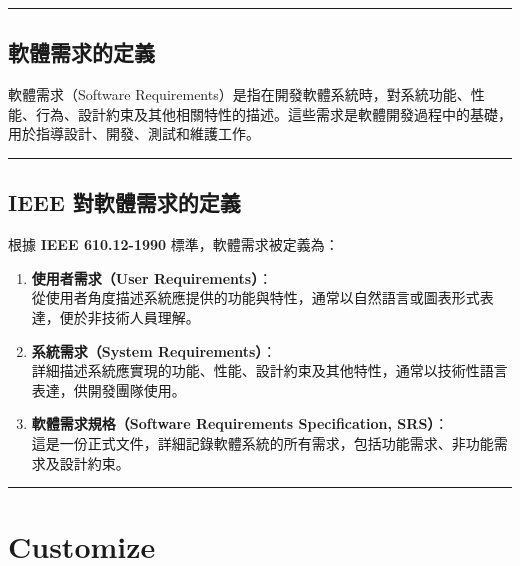 \documentclass[
  letterpaper,
  oneside,
  open=any]{scrbook}
\begin{document}
\begin{center}\rule{0.5\linewidth}{0.5pt}\end{center}

\section{軟體需求的定義}\label{ux8edfux9ad4ux9700ux6c42ux7684ux5b9aux7fa9}

軟體需求（Software
Requirements）是指在開發軟體系統時，對系統功能、性能、行為、設計約束及其他相關特性的描述。這些需求是軟體開發過程中的基礎，用於指導設計、開發、測試和維護工作。

\begin{center}\rule{0.5\linewidth}{0.5pt}\end{center}

\section{IEEE
對軟體需求的定義}\label{ieee-ux5c0dux8edfux9ad4ux9700ux6c42ux7684ux5b9aux7fa9}

根據 \textbf{IEEE 610.12-1990} 標準，軟體需求被定義為：

\begin{enumerate}
\def\labelenumi{\arabic{enumi}.}
\item
  \textbf{使用者需求（User Requirements）}：\\
  從使用者角度描述系統應提供的功能與特性，通常以自然語言或圖表形式表達，便於非技術人員理解。
\item
  \textbf{系統需求（System Requirements）}：\\
  詳細描述系統應實現的功能、性能、設計約束及其他特性，通常以技術性語言表達，供開發團隊使用。
\item
  \textbf{軟體需求規格（Software Requirements Specification, SRS）}：\\
  這是一份正式文件，詳細記錄軟體系統的所有需求，包括功能需求、非功能需求及設計約束。
\end{enumerate}

\begin{center}\rule{0.5\linewidth}{0.5pt}\end{center}


\chapter{Customize}\label{customize}
\end{document}
